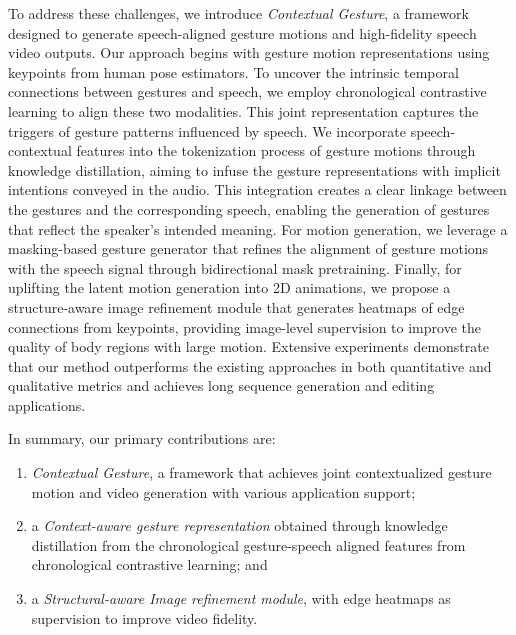 To address these challenges, we introduce \textit{Contextual Gesture}, a framework designed to generate speech-aligned gesture motions and high-fidelity speech video outputs. Our approach begins with gesture motion representations using keypoints from human pose estimators. To uncover the intrinsic temporal connections between gestures and speech, we employ chronological contrastive learning to align these two modalities. This joint representation captures the triggers of gesture patterns influenced by speech. We incorporate speech-contextual features into the tokenization process of gesture motions through knowledge distillation, aiming to infuse the gesture representations with implicit intentions conveyed in the audio. This integration creates a clear linkage between the gestures and the corresponding speech, enabling the generation of gestures that reflect the speaker's intended meaning. 
For motion generation, we leverage a masking-based gesture generator that refines the alignment of gesture motions with the speech signal through bidirectional mask pretraining. Finally, for uplifting the latent motion generation into 2D animations, we propose a structure-aware image refinement module that generates heatmaps of edge connections from keypoints, providing image-level supervision to improve the quality of body regions with large motion.
Extensive experiments demonstrate that our method outperforms the existing approaches in both quantitative and qualitative metrics and achieves long sequence generation and editing applications.


In summary, our primary contributions are: 

\begin{enumerate}
    \vspace{-0.2cm}
    \item \textit{Contextual Gesture}, a framework that achieves joint contextualized gesture motion and video generation with various application support;
    \vspace{-0.1cm}
    \item a \textit{Context-aware gesture representation} obtained through knowledge distillation from the chronological gesture-speech aligned features from chronological contrastive learning; and
    \vspace{-0.1cm}
    \item a \textit{Structural-aware Image refinement module}, with edge heatmaps as supervision to improve video fidelity.
\end{enumerate}

\vspace{-0.3 cm}
